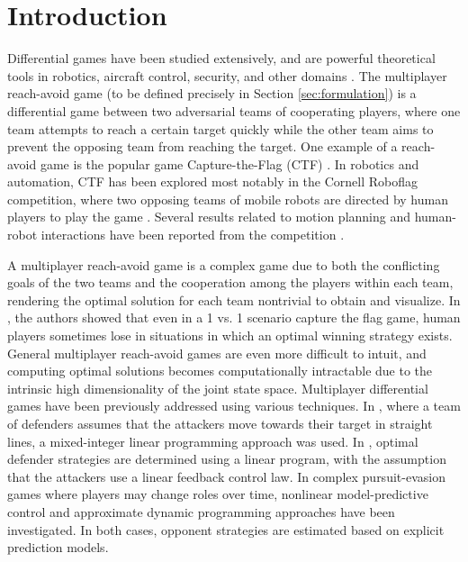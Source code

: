 \section{Introduction}
\label{sec:intro}
Differential games have been studied extensively, and are powerful theoretical tools in robotics, aircraft control, security, and other domains \cite{OFTHEAIRFORCEWASHINGTON:2009p37, Erzberger:2006p44, kiva2009}. The multiplayer reach-avoid game (to be defined precisely in Section \ref{sec:formulation}) is a differential game between two adversarial teams of cooperating players, where one team attempts to reach a certain target quickly while the other team aims to prevent the opposing team from reaching the target. One example of a reach-avoid game is the popular game Capture-the-Flag (CTF) \cite{HThesis, Huang2011}. In robotics and automation, CTF has been explored most notably in the Cornell Roboflag competition, where two opposing teams of mobile robots are directed by human players to play the game \cite{DAndrea:2003p95}. Several results related to motion planning and human-robot interactions have been reported from the competition \cite{Earl:2007p101, Campbell:2003p5, Waydo:2003p97, Parasuraman:2005p99}. 

A multiplayer reach-avoid game is a complex game due to both the conflicting goals of the two teams and the cooperation among the players within each team, rendering the optimal solution for each team nontrivial to obtain and visualize. In \cite{HThesis, Huang2011}, the authors showed that even in a 1 vs. 1 scenario capture the flag game, human players sometimes lose in situations in which an optimal winning strategy exists. General multiplayer reach-avoid games are even more difficult to intuit, and computing optimal solutions becomes computationally intractable due to the intrinsic high dimensionality of the joint state space. Multiplayer differential games have been previously addressed using various techniques. In \cite{Earl:2007p101}, where a team of defenders assumes that the attackers move towards their target in straight lines, a mixed-integer linear programming approach was used. In \cite{Chasparis:2005p102}, optimal defender strategies are determined using a linear program, with the assumption that the attackers use a linear feedback control law. In complex pursuit-evasion games where players may change roles over time, nonlinear model-predictive control \cite{Sprinkle:2004p100} and approximate dynamic programming \cite{McGrew:2008p103} approaches have been investigated. In both cases, opponent strategies are estimated based on explicit prediction models.

